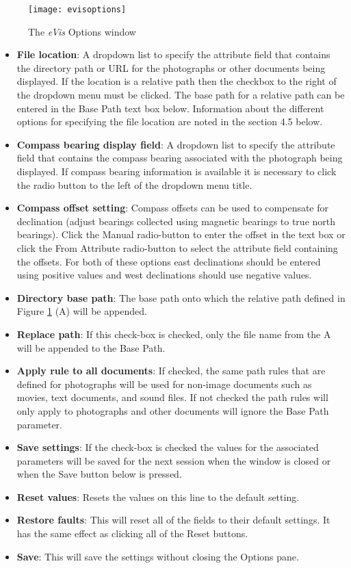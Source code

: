 \label{evis_options_window}

\begin{figure}[ht]
   \centering
   \texttt{[image: evisoptions]}
   \caption{\label{evisoptions}The \emph{eVis} Options window \wincaption}
\end{figure}

\begin{itemize}[label=--]
\item \textbf{File location}: A dropdown list to specify the attribute field that contains the
directory path or URL for the photographs or other documents being displayed. If the location is a
relative path then the checkbox to the right of the dropdown menu must be clicked. The base path for
a relative path can be entered in the Base Path text box below. Information about the different
options for specifying the file location are noted in the section 4.5 below.
\item \textbf{Compass bearing display field}: A dropdown list to specify the attribute field
that contains the compass bearing associated with the photograph being displayed. If compass bearing
information is available it is necessary to click the radio button to the left of the dropdown menu
title.
\item \textbf{Compass offset setting}: Compass offsets can be used to compensate for
declination (adjust bearings collected using magnetic bearings to true north bearings). Click the
Manual radio-button to enter the offset in the text box or click the From Attribute  radio-button to
select the attribute field containing the offsets. For both of these options east declinations
should be entered using positive values and west declinations should use negative values.
\item \textbf{Directory base path}: The base path onto which the relative path defined in
Figure \ref{evisoptions} (A) will be appended.
\item \textbf{Replace path}: If this check-box is checked, only the file name from the A
will be appended to the Base Path.
\item \textbf{Apply rule to all documents}: If checked, the same path rules that are defined
for photographs will be used for non-image documents such as movies, text documents, and sound
files. If not checked the path rules will only apply to photographs and other documents will ignore
the Base Path  parameter.
\item \textbf{Save settings}: If the check-box is checked the values for the associated
parameters will be saved for the next session when the window is closed or when the Save button
below is pressed.
\item \textbf{Reset values}: Resets the values on this line to the default setting.
\item \textbf{Restore faults}: This will reset all of the fields to their default settings.
It has the same effect as clicking all of the Reset buttons.
\item \textbf{Save}: This will save the settings without closing the Options pane.
\end{itemize}

